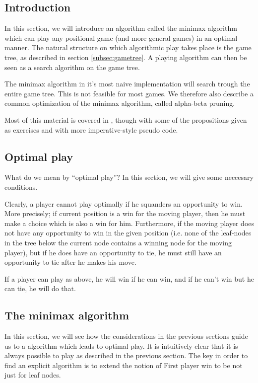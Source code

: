 \subsection{Introduction}

In this section, we will introduce an algorithm called the minimax algorithm which can play any positional game (and more general games) in an optimal manner.
The natural structure on which algorithmic play takes place is the game tree, as described in section \ref{subsec:gametree}.
A playing algorithm can then be seen as a search algorithm on the game tree.

The minimax algorithm in it's most naive implementation will search trough the entire game tree. This is not feasible for most games.
We therefore also describe a common optimization of the minimax algorithm, called alpha-beta pruning.


Most of this material is covered in \citep{aimodernapproach}, though with some of the propositions given as exercises and with more imperative-style pseudo code.

\subsection{Optimal play}
\label{sec:optimal_play}

What do we mean by ``optimal play''?
In this section, we will give some neccesary conditions.

Clearly, a player cannot play optimally if he squanders an opportunity to win.
More precisely; if current position is a win for the moving player, then he must make a choice which is also a win for him.
Furthermore, if the moving player does not have any opportunity to win in the given position (i.e. none of the leaf-nodes in the tree below the current node contains a winning node for the moving player), but if he does have an opportunity to tie, he must still have an opportunity to tie after he makes his move.

If a player can play as above, he will win if he can win, and if he can't win but he can tie, he will do that.

\subsection{The minimax algorithm}
\label{sec:minimax}

In this section, we will see how the considerations in the previous sections guide us to a algorithm which leads to optimal play.
It is intuitively clear that it is always possible to play as described in the previous section.
The key in order to find an explicit algorithm is to extend the notion of First player win to be not just for leaf nodes.

